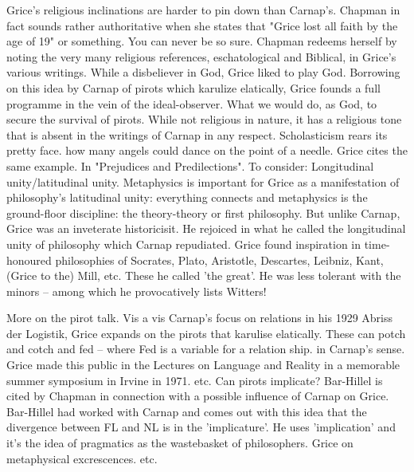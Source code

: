 \documentclass[10pt,titlepage]{book}
\begin{document}
{Grice's religious inclinations are harder to pin down than Carnap’s.
Chapman in  fact sounds rather authoritative when she states that 
"Grice lost all faith by  the age of 19" or something. You can never be so 
sure. Chapman redeems herself  by noting the very many religious references, 
eschatological and Biblical, in  Grice's various writings. While a disbeliever 
in God, Grice liked to play God.  Borrowing on this idea by Carnap of 
pirots which karulize elatically, Grice  founds a full programme in the vein of 
the ideal-observer. What we would do, as  God, to secure the survival of 
pirots. While not religious in nature, it has a  religious tone that is absent 
in the writings of Carnap in any  respect. 
Scholasticism  rears its pretty face. how many angels could dance on the 
point of a needle.  Grice cites the same example. In "Prejudices and 
Predilections". To consider:  Longitudinal unity/latitudinal unity. Metaphysics is 
important for Grice as a  manifestation of philosophy's latitudinal unity: 
everything connects and  metaphysics is the ground-floor discipline: the 
theory-theory or first  philosophy. But unlike Carnap, Grice was an inveterate 
historicisit. He rejoiced  in what he called the longitudinal unity of 
philosophy which Carnap repudiated.  Grice found inspiration in time-honoured 
philosophies of Socrates, Plato,  Aristotle, Descartes, Leibniz, Kant, (Grice to 
the) Mill, etc. These he called  'the great'. He was less tolerant with the 
minors -- among which he  provocatively lists Witters! 
 
More  on the pirot talk. Vis a vis Carnap’s focus on relations in his 1929  
Abriss der Logistik, Grice expands on the pirots that karulise elatically. 
These  can potch and cotch and fed – where Fed is a variable for a relation 
ship. in  Carnap's sense. Grice made this public in the Lectures on Language 
and Reality  in a  memorable summer symposium in Irvine in 1971. etc. 
Can  pirots implicate? Bar-Hillel  is cited by Chapman in connection with a 
possible influence of Carnap on Grice.  Bar-Hillel had worked with Carnap 
and comes out with this idea that the  divergence between FL and NL is in the 
'implicature'. He uses 'implication' and  it's the idea of pragmatics as 
the wastebasket of philosophers. Grice on  metaphysical excrescences. etc.

}
\end{document}
